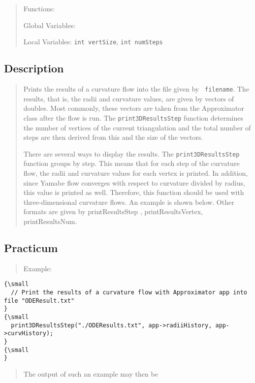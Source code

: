\begin{quotation}
Functions:

Global Variables:

Local Variables: \texttt{int vertSize}, \texttt{int numSteps}
\end{quotation}

\subsection*{Description}

\begin{quotation}
Prints the results of a curvature flow into the file given by \texttt{%
filename}. The results, that is, the radii and curvature values, are given
by vectors of doubles. Most commonly, these vectors are taken from the
Approximator class after the flow is run. The \texttt{print3DResultsStep}
function determines the number of vertices of the current triangulation and
the total number of steps are then derived from this and the size of the
vectors.

There are several ways to display the results. The \texttt{print3DResultsStep%
} function groups by step. This means that for each step of the curvature
flow, the radii and curvature values for each vertex is printed. In
addition, since Yamabe flow converges with respect to curvature divided by
radius, this value is printed as well. Therefore, this function should be
used with three-dimensional curvature flows. An example is shown below.
Other formats are given by printResultsStep , printResultsVertex,
printResultsNum.
\end{quotation}

\subsection*{Practicum}

\begin{quotation}
Example:{\small }
\end{quotation}

\begin{verbatim}
{\small 
  // Print the results of a curvature flow with Approximator app into file "ODEResult.txt"
}
{\small 
  print3DResultsStep("./ODEResults.txt", app->radiiHistory, app->curvHistory);
}
{\small   
}
\end{verbatim}

\begin{quotation}
The output of such an example may then be{\small }
\end{quotation}

